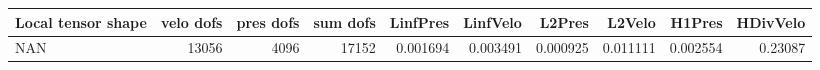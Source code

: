 \begin{tabular}{lrrrrrrrrr}
\toprule
Local tensor shape &  velo dofs &  pres dofs &  sum dofs &  LinfPres &  LinfVelo &   L2Pres &   L2Velo &   H1Pres &  HDivVelo \\
\midrule
               NAN &      13056 &       4096 &     17152 &  0.001694 &  0.003491 & 0.000925 & 0.011111 & 0.002554 &   0.23087 \\
\bottomrule
\end{tabular}
